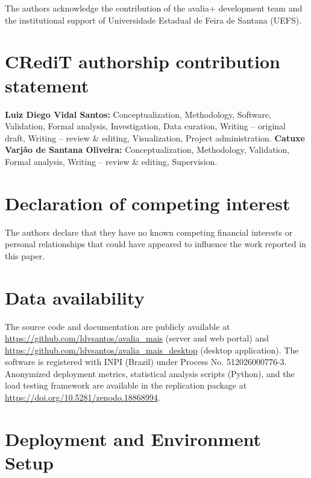 \documentclass[preprint,12pt,a4paper]{elsarticle}
\begin{document}
The authors acknowledge the contribution of the avalia+ development team and the institutional support of Universidade Estadual de Feira de Santana (UEFS).

\section*{CRediT authorship contribution statement}

\textbf{Luiz Diego Vidal Santos:} Conceptualization, Methodology, Software, Validation, Formal analysis, Investigation, Data curation, Writing -- original draft, Writing -- review \& editing, Visualization, Project administration. \textbf{Catuxe Varjão de Santana Oliveira:} Conceptualization, Methodology, Validation, Formal analysis, Writing -- review \& editing, Supervision.

\section*{Declaration of competing interest}

The authors declare that they have no known competing financial interests or personal relationships that could have appeared to influence the work reported in this paper.

\section*{Data availability}

The source code and documentation are publicly available at \url{https://github.com/ldvsantos/avalia_mais} (server and web portal) and \url{https://github.com/ldvsantos/avalia_mais_desktop} (desktop application). The software is registered with INPI (Brazil) under Process No. 512026000776-3. Anonymized deployment metrics, statistical analysis scripts (Python), and the load testing framework are available in the replication package at \url{https://doi.org/10.5281/zenodo.18868994}.

\appendix

\section{Deployment and Environment Setup}
\label{app:deployment}
\end{document}
